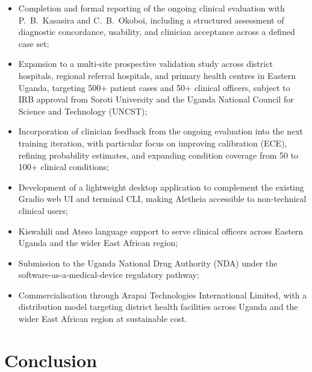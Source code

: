 \documentclass[journal]{IEEEtran}
\begin{document}
\begin{itemize}
  \item Completion and formal reporting of the ongoing clinical
        evaluation with P.~B.~Kasasira and C.~B.~Okoboi, including
        a structured assessment of diagnostic concordance, usability,
        and clinician acceptance across a defined case set;

  \item Expansion to a multi-site prospective validation study
        across district hospitals, regional referral hospitals, and
        primary health centres in Eastern Uganda, targeting 500+
        patient cases and 50+ clinical officers, subject to IRB
        approval from Soroti University and the Uganda National
        Council for Science and Technology (UNCST);

  \item Incorporation of clinician feedback from the ongoing
        evaluation into the next training iteration, with particular
        focus on improving calibration (ECE), refining probability
        estimates, and expanding condition coverage from 50 to
        100+ clinical conditions;

  \item Development of a lightweight desktop application to
        complement the existing Gradio web UI and terminal CLI,
        making Aletheia accessible to non-technical clinical users;

  \item Kiswahili and Ateso language support to serve clinical
        officers across Eastern Uganda and the wider East African
        region;

  \item Submission to the Uganda National Drug Authority (NDA)
        under the software-as-a-medical-device regulatory pathway;

  \item Commercialisation through Arapai Technologies International Limited, with a distribution model targeting district
        health facilities across Uganda and the wider East African
        region at sustainable cost.
\end{itemize}

\section{Conclusion}
\label{sec:conclusion}
\end{document}
